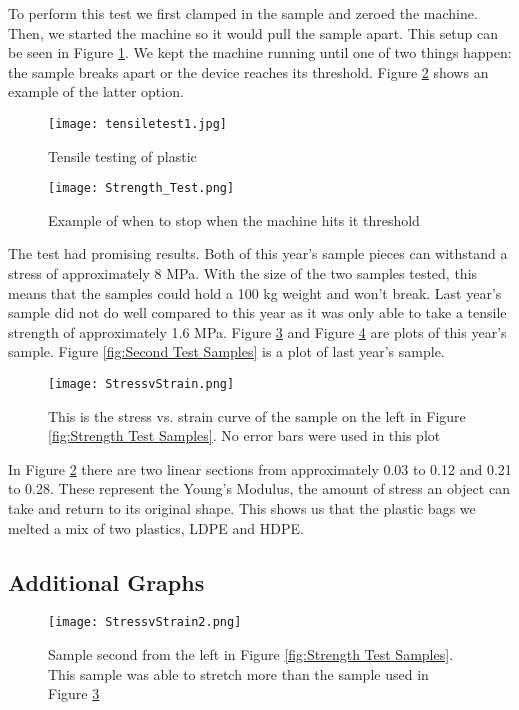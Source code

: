 \documentclass[11pt,english]{article}
\begin{document}
To perform this test we first clamped in the sample and zeroed the machine.  Then, we started the machine so it would pull the sample apart. This setup can be seen in Figure \ref{fig:tensiletest1}.  We kept the machine running until one of two things happen: the sample breaks apart or the device reaches its threshold. Figure \ref{fig:Strength Test} shows an example of the latter option.
\begin{figure}[ht!]
\centering
\texttt{[image: tensiletest1.jpg]}
\caption{Tensile testing of plastic}
\label{fig:tensiletest1}
\end{figure}
\begin{figure}[h!]
\centering
\texttt{[image: Strength\_Test.png]}
\caption{ Example of when to stop when the machine hits it threshold}
\label{fig:Strength Test}
\end{figure}

\newpage
The test had promising results.  Both of this year’s sample pieces can withstand a stress of approximately 8 MPa.  With the size of the two samples tested, this means that the samples could hold a 100 kg weight and won’t break.  Last year’s sample did not do well compared to this year as it was only able to take a tensile strength of approximately 1.6 MPa. Figure \ref{fig:Stress Strain Curve} and Figure \ref{fig:First Test Samples} are plots of this year's sample. Figure \ref{fig:Second Test Samples} is a plot of last year's sample.
\begin{figure}[h!]
\centering
\texttt{[image: StressvStrain.png]}
\caption{ This is the stress vs. strain curve of the sample on the left in Figure \ref{fig:Strength Test Samples}.  No error bars were used in this plot}
\label{fig:Stress Strain Curve}
\end{figure}

In Figure \ref{fig:Strength Test} there are two linear sections from approximately 0.03 to 0.12 and 0.21 to 0.28.  These represent the Young’s Modulus, the amount of stress an object can take and return to its original shape.  This shows us that the plastic bags we melted a mix of two plastics, LDPE and HDPE.


\subsection{Additional Graphs}
\begin{figure}[h!]
\centering
\texttt{[image: StressvStrain2.png]}
\caption{ Sample second from the left in Figure \ref{fig:Strength Test Samples}. This sample was able to stretch more than the sample used in Figure \ref{fig:Stress Strain Curve}}
\label{fig:First Test Samples}
\end{figure}
\end{document}
